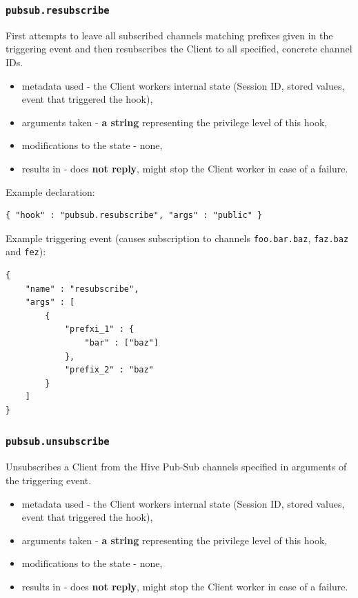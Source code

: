 \documentclass[a4paper]{article}
\begin{document}
\subsubsection{\texttt{pubsub.resubscribe}}
\label{sec-9-2-5}

First attempts to leave all subscribed channels matching prefixes given in the triggering event and then resubscribes the Client to all specified, concrete channel IDs.


\begin{itemize}
\item metadata used - the Client workers internal state (Session ID, stored values, event that triggered the hook),
\item arguments taken - \textbf{a string} representing the privilege level of this hook,
\item modifications to the state - none,
\item results in - does \textbf{not reply}, might stop the Client worker in case of a failure.
\end{itemize}

\noindent
Example declaration:

\begin{verbatim}
{ "hook" : "pubsub.resubscribe", "args" : "public" }
\end{verbatim}




\noindent
Example triggering event (causes subscription to channels \texttt{foo.bar.baz}, \texttt{faz.baz} and \texttt{fez}):


\begin{verbatim}
{
    "name" : "resubscribe",
    "args" : [
        {
            "prefxi_1" : {
                "bar" : ["baz"]
            },
            "prefix_2" : "baz"
        }
    ]
}
\end{verbatim}
\subsubsection{\texttt{pubsub.unsubscribe}}
\label{sec-9-2-6}


Unsubscribes a Client from the Hive Pub-Sub channels specified in arguments of the triggering event.


\begin{itemize}
\item metadata used - the Client workers internal state (Session ID, stored values, event that triggered the hook),
\item arguments taken - \textbf{a string} representing the privilege level of this hook,
\item modifications to the state - none,
\item results in - does \textbf{not reply}, might stop the Client worker in case of a failure.
\end{itemize}
\end{document}
